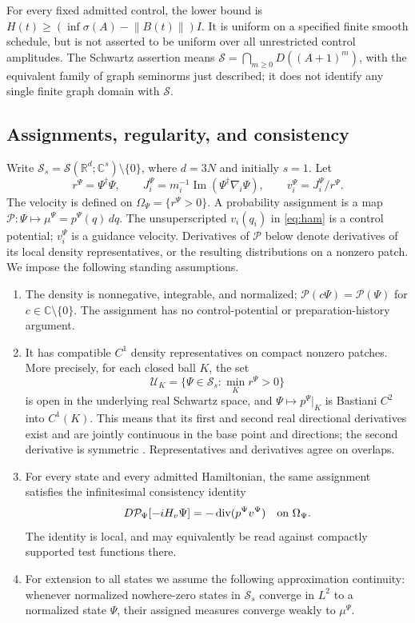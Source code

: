 \documentclass[11pt]{article}
\numberwithin{equation}{section}
\theoremstyle{definition}
\newcommand{\R}{\mathbb R}
\newcommand{\C}{\mathbb C}
\newcommand{\Sch}{\mathcal S}
\newcommand{\Pcal}{\mathcal P}
\newcommand{\diver}{\operatorname{div}}
\newcommand{\norm}[1]{\left\|#1\right\|}
\begin{document}
For every fixed admitted control, the lower bound is \(H(t)\ge (\inf\sigma(A)-\norm{B(t)})I\). It is uniform on a specified finite smooth schedule, but is not asserted to be uniform over all unrestricted control amplitudes. The Schwartz assertion means \(\Sch=\bigcap_{m\ge0}D((A+1)^m)\), with the equivalent family of graph seminorms just described; it does not identify any single finite graph domain with \(\Sch\).

\subsection{Assignments, regularity, and consistency}

Write \(\mathscr S_s=\Sch(\R^d;\C^s)\setminus\{0\}\), where \(d=3N\) and initially \(s=1\). Let
\[
 r^\Psi=\Psi^\dagger\Psi,\qquad
 J_i^\Psi=m_i^{-1}\operatorname{Im}(\Psi^\dagger\nabla_i\Psi),
 \qquad v_i^\Psi=J_i^\Psi/r^\Psi.
\]
The velocity is defined on \(\Omega_\Psi=\{r^\Psi>0\}\). A probability assignment is a map
\(\Pcal:\Psi\mapsto \mu^\Psi=p^\Psi(q)\,dq\). The unsuperscripted \(v_i(q_i)\) in \eqref{eq:ham} is a control potential; \(v_i^\Psi\) is a guidance velocity. Derivatives of \(\Pcal\) below denote derivatives of its local density representatives, or the resulting distributions on a nonzero patch.
We impose the following standing assumptions.

\begin{enumerate}[label=(A\arabic*),ref=A\arabic*]
\item\label{ass:prob}
The density is nonnegative, integrable, and normalized; \(\Pcal(c\Psi)=\Pcal(\Psi)\) for \(c\in\C\setminus\{0\}\). The assignment has no control-potential or preparation-history argument.
\item\label{ass:smooth}
It has compatible \(C^1\) density representatives on compact nonzero patches. More precisely, for each closed ball \(K\), the set
\[
 \mathscr U_K=\{\Psi\in\mathscr S_s:\min_K r^\Psi>0\}
\]
is open in the underlying real Schwartz space, and
\(\Psi\mapsto p^\Psi|_K\) is Bastiani \(C^2\) into \(C^1(K)\). This means that its first and second real directional derivatives exist and are jointly continuous in the base point and directions; the second derivative is symmetric \cite{Bastiani1964}. Representatives and derivatives agree on overlaps.
\item\label{ass:cc}
For every state and every admitted Hamiltonian, the same assignment satisfies the infinitesimal consistency identity
\begin{equation}\label{eq:cc}
 D\Pcal_\Psi[-iH_v\Psi]=-\diver(p^\Psi v^\Psi)
 \quad\hbox{on }\Omega_\Psi.
\end{equation}
The identity is local, and may equivalently be read against compactly supported test functions there.
\item\label{ass:nodes}
For extension to all states we assume the following approximation continuity: whenever normalized nowhere-zero states in \(\mathscr S_s\) converge in \(L^2\) to a normalized state \(\Psi\), their assigned measures converge weakly to \(\mu^\Psi\).
\end{enumerate}
\end{document}
